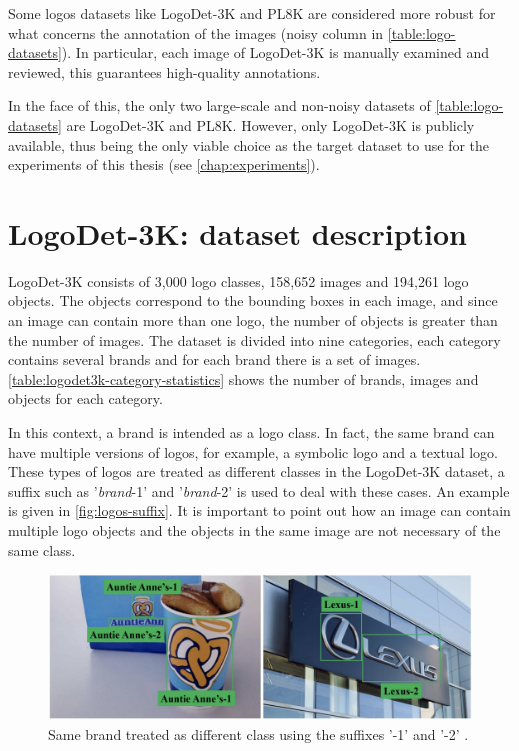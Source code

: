 Some logos datasets like LogoDet-3K and PL8K are considered more robust for what concerns the annotation of the images (noisy column in \autoref{table:logo-datasets}). In particular, each image of LogoDet-3K is manually examined and
reviewed, this guarantees high-quality annotations.

In the face of this, the only two large-scale and non-noisy datasets of \autoref{table:logo-datasets} are LogoDet-3K and PL8K. However, only LogoDet-3K is publicly available, thus being the only viable choice as the target dataset to use for the experiments of this thesis (see \autoref{chap:experiments}).


\section{LogoDet-3K: dataset description}
\label{sec:logodet-desc}
LogoDet-3K consists of 3,000 logo classes,
158,652 images and 194,261 logo objects. The objects correspond to the bounding boxes in each image, and since an image can contain more than one logo, the number of objects is greater than the number of images. 
The dataset is divided into nine categories, each category contains several brands and for each brand there is a set of images. \autoref{table:logodet3k-category-statistics} shows the number of brands, images and objects for each category.

In this context, a brand is intended as a logo class. In fact, the same brand can have multiple versions of logos, for example, a symbolic logo and a textual logo. These types of logos are treated as different classes in the LogoDet-3K dataset, a suffix such as '\textit{brand}-1' and '\textit{brand}-2' is used to deal with these cases. An example is given in \autoref{fig:logos-suffix}.
It is important to point out how an image can contain multiple logo objects and the objects in the same image are not necessary of the same class.


\begin{figure}%
	\centering

    \begin{center}
        \includegraphics[width=\columnwidth]{images/logos-suffix.png}
    \end{center}
	\caption{Same brand treated as different class using the suffixes '-1' and '-2' \cite{wang2022logodet}.}%
	\label{fig:logos-suffix}%
\end{figure}

